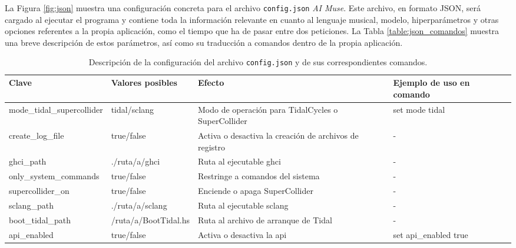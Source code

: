 La Figura \ref{fig:json} muestra una configuración concreta para el archivo \texttt{config.json} \emph{AI Muse}. Este archivo, en formato JSON, será cargado al ejecutar el programa y contiene toda la información relevante en cuanto al lenguaje musical, modelo, hiperparámetros y otras opciones referentes a la propia aplicación, como el tiempo que ha de pasar entre dos peticiones. La Tabla \ref{table:json_comandos} muestra una breve descripción de estos parámetros, así como su traducción a comandos dentro de la propia aplicación.




\begin{table}[htbp]
    \centering
    \caption{Descripción de la configuración del archivo \texttt{config.json} y de sus correspondientes comandos.}
    \label{tab:config-description}
    \fontsize{9.5pt}{11pt}\selectfont
    \begingroup
    \begin{tabularx}{\linewidth}{llXl}
        \toprule
        \rowcolor{azul_unir} %
        \textbf{Clave} & \textbf{Valores posibles} & \textbf{Efecto}& \textbf{Ejemplo de uso en comando} \\
        \midrule
    mode\_tidal\_supercollider & tidal/sclang & Modo de operación para TidalCycles o SuperCollider  & set mode tidal \\
    create\_log\_file & \textcolor{truecolor}{true}/\textcolor{falsecolor}{false} & Activa o desactiva la creación de archivos de registro  & - \\
    ghci\_path & \textcolor{pathcolor}{./ruta/a/ghci} & Ruta al ejecutable ghci  & - \\
    only\_system\_commands & \textcolor{truecolor}{true}/\textcolor{falsecolor}{false} & Restringe a comandos del sistema  & - \\
    supercollider\_on & \textcolor{truecolor}{true}/\textcolor{falsecolor}{false} & Enciende o apaga SuperCollider  & - \\
    sclang\_path & \textcolor{pathcolor}{./ruta/a/sclang} & Ruta al ejecutable sclang  & - \\
    boot\_tidal\_path & \textcolor{pathcolor}{/ruta/a/BootTidal.hs} & Ruta al archivo de arranque de Tidal  & - \\
    api\_enabled & \textcolor{truecolor}{true}/\textcolor{falsecolor}{false} & Activa o desactiva la \gls{api}  & set api\_enabled \textcolor{truecolor}{true} \\

\end{tabularx}
\end{table}
